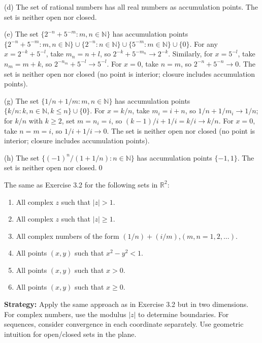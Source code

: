 (d) The set of rational numbers has all real numbers as accumulation points. The set is neither open nor closed.

(e) The set $\{2^{-n} + 5^{-m} : m,n \in \mathbb{N}\}$ has accumulation points $\{2^{-n} + 5^{-m} : m,n \in \mathbb{N}\} \cup \{2^{-n} : n \in \mathbb{N}\} \cup \{5^{-m} : m \in \mathbb{N}\} \cup \{0\}$. For any $x = 2^{-k} + 5^{-l}$, take $m_n = n + l$, so $2^{-k} + 5^{-m_n} \to 2^{-k}$. Similarly, for $x = 5^{-l}$, take $n_m = m + k$, so $2^{-n_m} + 5^{-l} \to 5^{-l}$. For $x = 0$, take $n = m$, so $2^{-n} + 5^{-n} \to 0$. The set is neither open nor closed (no point is interior; closure includes accumulation points).

(g) The set $\{1/n + 1/m : m,n \in \mathbb{N}\}$ has accumulation points $\{k/n : k,n \in \mathbb{N}, k \leq n\} \cup \{0\}$. For $x = k/n$, take $m_i = i + n$, so $1/n + 1/m_i \to 1/n$; for $k/n$ with $k \geq 2$, set $m = n_i = i$, so $(k-1)/i + 1/i = k/i \to k/n$. For $x = 0$, take $n = m = i$, so $1/i + 1/i \to 0$. The set is neither open nor closed (no point is interior; closure includes accumulation points).

(h) The set $\{(-1)^n/(1+1/n) : n \in \mathbb{N}\}$ has accumulation points $\{-1, 1\}$. The set is neither open nor closed.\qed


\begin{problembox}
\begin{problemstatement}
The same as Exercise 3.2 for the following sets in $\mathbb{R}^2$:
\begin{enumerate}[label=\textbf{(\alph*)}]
\item All complex $z$ such that $|z| > 1$.
\item All complex $z$ such that $|z| \ge 1$.
\item All complex numbers of the form $(1/n) + (i/m)$,\quad $(m, n = 1, 2, \dots)$.
\item All points $(x, y)$ such that $x^2 - y^2 < 1$.
\item All points $(x, y)$ such that $x > 0$.
\item All points $(x, y)$ such that $x \ge 0$.
\end{enumerate}
\end{problemstatement}
\end{problembox}

\noindent\textbf{Strategy:} Apply the same approach as in Exercise 3.2 but in two dimensions. For complex numbers, use the modulus $|z|$ to determine boundaries. For sequences, consider convergence in each coordinate separately. Use geometric intuition for open/closed sets in the plane.

